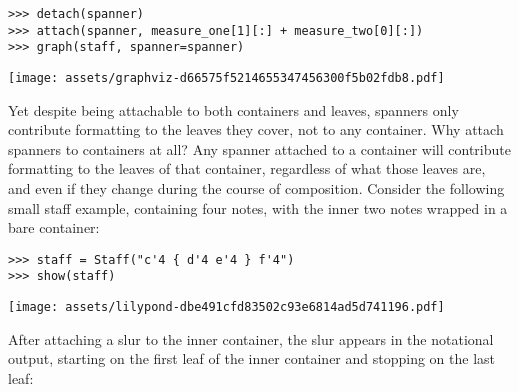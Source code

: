 \begin{comment}
<abjad>
detach(spanner)
attach(spanner, measure_one[1][:] + measure_two[0][:])
graph(staff, spanner=spanner)
</abjad>
\end{comment}

\begin{abjadbookoutput}
\begin{singlespacing}
\vspace{-0.5\baselineskip}
\begin{verbatim}
>>> detach(spanner)
>>> attach(spanner, measure_one[1][:] + measure_two[0][:])
>>> graph(staff, spanner=spanner)
\end{verbatim}
\noindent\texttt{[image: assets/graphviz-d66575f5214655347456300f5b02fdb8.pdf]}
\end{singlespacing}
\end{abjadbookoutput}

\noindent Yet despite being attachable to both containers and leaves, spanners
only contribute formatting to the leaves they cover, not to any container. Why
attach spanners to containers at all? Any spanner attached to a container will
contribute formatting to the leaves of that container, regardless of what those
leaves are, and even if they change during the course of composition. Consider
the following small staff example, containing four notes, with the inner two
notes wrapped in a bare container:

\begin{comment}
<abjad>
staff = Staff("c'4 { d'4 e'4 } f'4")
show(staff)
</abjad>
\end{comment}

\begin{abjadbookoutput}
\begin{singlespacing}
\vspace{-0.5\baselineskip}
\begin{verbatim}
>>> staff = Staff("c'4 { d'4 e'4 } f'4")
>>> show(staff)
\end{verbatim}
\noindent\texttt{[image: assets/lilypond-dbe491cfd83502c93e6814ad5d741196.pdf]}
\end{singlespacing}
\end{abjadbookoutput}

\noindent After attaching a slur to the inner container, the slur appears in
the notational output, starting on the first leaf of the inner container and
stopping on the last leaf:

\begin{comment}
<abjad>
attach(Slur(), staff[1])
show(staff)
</abjad>
\end{comment}

